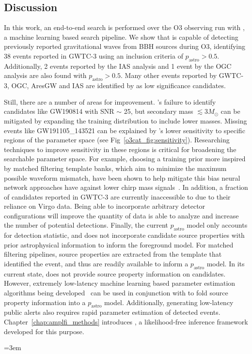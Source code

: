 \begin{refsection}
\newpage


\section{Discussion}\label{o3cat_sec:conclusion}
In this work, an end-to-end search is performed over the O3 observing run with \aframe, a machine learning based search pipeline. 
We show that \aframe is capable of detecting previously reported gravitational waves from BBH sources during O3, identifying 38 events reported in GWTC-3 using an inclusion criteria of $p_{\mathrm{astro}} > 0.5$. 
Additionally, 2 events reported by the IAS analysis and 1 event by the OGC analysis are also found with $p_{\mathrm{astro}} > 0.5$. 
Many other events reported by GWTC-3, OGC, AresGW and IAS are identified by \aframe as low significance candidates. 

Still, there are a number of areas for improvement. 
\aframe's failure to identify candidates like GW190814 with SNR $\sim$ 25, but secondary mass $\lesssim 3 M_\odot$ can be mitigated by expanding the training distribution to include lower masses. 
Missing events like GW191105\_143521 can be explained by \aframe's lower sensitivity to specific regions of the parameter space (see Fig~\ref{o3cat_fig:sensitivity}). 
Researching techniques to improve sensitivity in these regions is critical for broadening the searchable parameter space. 
For example, choosing a training prior more inspired by matched filtering template banks, which aim to minimize the maximum possible waveform mismatch, have been shown to help mitigate this bias neural network approaches have against lower chirp mass signals~\cite{sage}. 
In addition, a fraction of candidates reported in GWTC-3 are currently inaccessible to \aframe due to their reliance on Virgo data. 
Being able to incorporate arbitrary detector configurations will improve the quantity of data \aframe is able to analyze and increase the number of potential detections. 
Finally, the current $p_{\mathrm{astro}}$ model only accounts for detection statistic, and does not incorporate candidate source properties with prior astrophysical information to inform the foreground model. 
For matched filtering pipelines, source properties are extracted from the template that identified the event, and thus are readily available to inform a $p_{\mathrm{astro}}$ model. 
In its current state, \aframe does not provide source property information on candidates. 
However, extremely low-latency machine learning based parameter estimation algorithms being developed~\cite{Chatterjee:2024pbj, Dax_2021} can be used in conjunction with \aframe to fold source property information into a $p_{\mathrm{astro}}$ model.
Additionally, generating low-latency public alerts also requires rapid parameter estimation of detected events.
Chapter~\ref{chap:amplfi_methods} introduces \amplfi, a likelihood-free inference framework developed for this purpose.





\singlespacing
\begingroup
\emergencystretch=3em
\printbibliography[title=References,heading=subbibintoc]
\endgroup
\end{refsection}